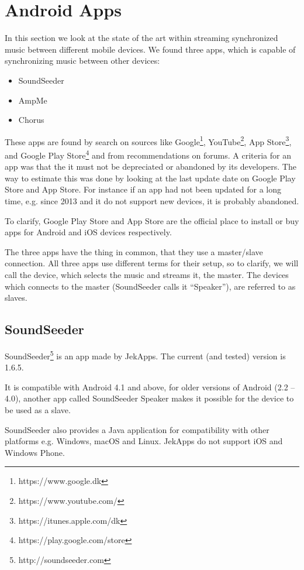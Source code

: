 \section{Android Apps}\label{sec:sota_apps}
In this section we look at the state of the art within streaming synchronized music between different mobile devices.
We found three apps, which is capable of synchronizing music between other devices:
\begin{itemize}
    \item SoundSeeder
    \item AmpMe
    \item Chorus
\end{itemize}

These apps are found by search on sources like Google\footnote{https://www.google.dk}, YouTube\footnote{https://www.youtube.com/}, App Store\footnote{https://itunes.apple.com/dk}, and Google Play Store\footnote{https://play.google.com/store} and from recommendations on forums. 
A criteria for an app was that the it must not be depreciated or abandoned by its developers.
The way to estimate this was done by looking at the last update date on Google Play Store and App Store.
For instance if an app had not been updated for a long time, e.g. since 2013 and it do not support new devices, it is probably abandoned.

To clarify, Google Play Store and App Store are the official place to install or buy apps for Android and iOS devices respectively.

The three apps have the thing in common, that they use a master/slave connection.
All three apps use different terms for their setup, so to clarify, 
we will call the device, which selects the music and streams it, the master.
The devices which connects to the master (SoundSeeder calls it ``Speaker''), are referred to as slaves.

\subsection{SoundSeeder}\label{subsec:soundseeder}
SoundSeeder\footnote{http://soundseeder.com} is an app made by JekApps. 
The current (and tested) version is 1.6.5.

It is compatible with Android 4.1 and above, for older versions of Android (2.2 -- 4.0),
another app called SoundSeeder Speaker makes it possible for the device to be used as a slave.

SoundSeeder also provides a Java application for compatibility with other platforms e.g. Windows, macOS and Linux.
JekApps do not support iOS and Windows Phone\cite{soundseeder_ios}.

